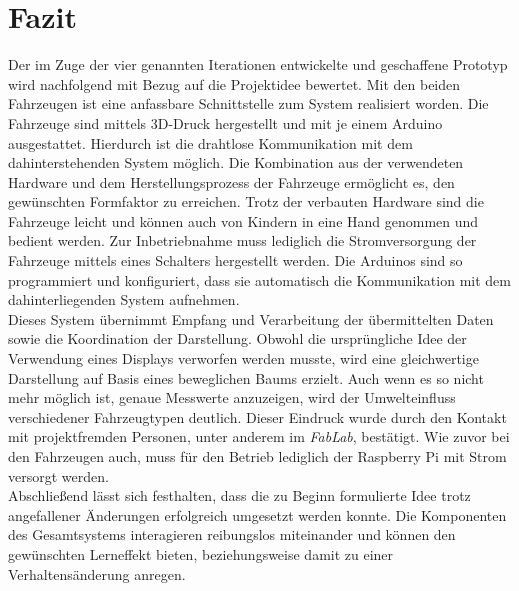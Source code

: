 \documentclass[.../Dokumentation.tex]{subfile}
\begin{document}
\section{Fazit}\label{sec-result}
Der im Zuge der vier genannten Iterationen entwickelte und geschaffene Prototyp 
wird nachfolgend mit Bezug auf die Projektidee bewertet. Mit den beiden 
Fahrzeugen ist eine anfassbare Schnittstelle zum System realisiert worden. Die 
Fahrzeuge sind mittels 3D-Druck hergestellt und mit je einem Arduino 
ausgestattet. Hierdurch ist die drahtlose Kommunikation mit dem 
dahinterstehenden System möglich. Die Kombination aus der verwendeten Hardware 
und dem Herstellungsprozess der Fahrzeuge ermöglicht es, den gewünschten 
Formfaktor zu erreichen. Trotz der verbauten Hardware sind die Fahrzeuge leicht 
und können auch von Kindern in eine Hand genommen und bedient werden. 
Zur Inbetriebnahme muss lediglich die Stromversorgung der Fahrzeuge mittels 
eines Schalters hergestellt werden. Die Arduinos sind so programmiert und 
konfiguriert, dass sie automatisch die Kommunikation mit dem dahinterliegenden 
System aufnehmen. \\
Dieses System übernimmt Empfang und Verarbeitung der übermittelten Daten sowie 
die Koordination der Darstellung. 
Obwohl die ursprüngliche Idee der Verwendung 
eines Displays verworfen werden musste, wird eine gleichwertige Darstellung auf 
Basis eines beweglichen Baums erzielt. Auch wenn es so nicht mehr möglich ist, 
genaue Messwerte anzuzeigen, wird der Umwelteinfluss verschiedener 
Fahrzeugtypen deutlich. Dieser Eindruck wurde durch den Kontakt mit 
projektfremden Personen, unter anderem im \emph{FabLab}, bestätigt. Wie zuvor 
bei den Fahrzeugen auch, muss für den Betrieb lediglich der Raspberry Pi mit 
Strom versorgt werden.\\
Abschließend lässt sich festhalten, dass die zu Beginn formulierte Idee trotz 
angefallener Änderungen erfolgreich umgesetzt werden konnte. Die Komponenten 
des Gesamtsystems interagieren reibungslos miteinander und können den 
gewünschten Lerneffekt bieten,  beziehungsweise damit zu einer 
Verhaltensänderung anregen.
\end{document}
